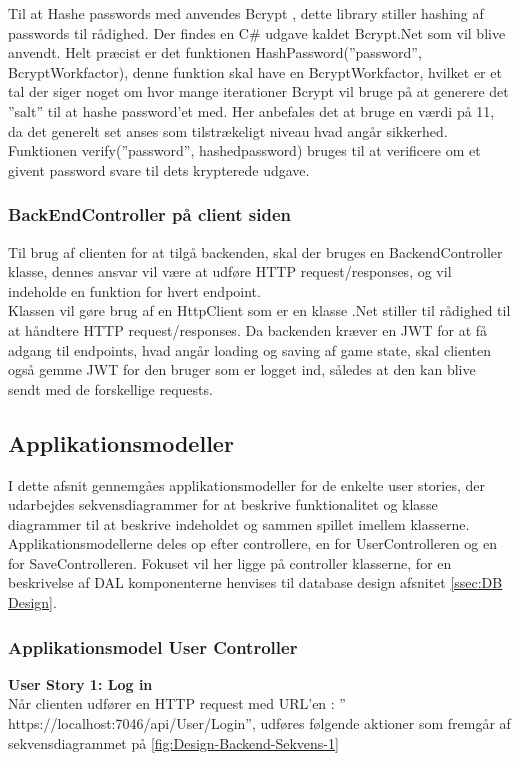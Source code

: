 Til at Hashe passwords med anvendes Bcrypt \cite{Bcrypt}, dette library stiller hashing af passwords til rådighed. Der findes en C\# udgave kaldet Bcrypt.Net  som vil blive anvendt. Helt præcist er det funktionen HashPassword(”password”, BcryptWorkfactor), denne funktion skal have en BcryptWorkfactor, hvilket er et tal der siger noget om hvor mange iterationer Bcrypt vil bruge på at generere det ”salt” til at hashe password’et med. Her anbefales det at bruge en værdi på 11, da det generelt set anses som tilstrækeligt niveau hvad angår sikkerhed.
Funktionen verify(”password”, hashedpassword) bruges til at verificere om et givent password svare til dets krypterede udgave.\\

\subsubsection{BackEndController på client siden}
Til brug af clienten for at tilgå backenden, skal der bruges en BackendController klasse, dennes ansvar vil være at udføre HTTP request/responses, og vil indeholde en funktion for hvert endpoint.\\
 
Klassen vil gøre brug af en HttpClient som er en klasse .Net stiller til rådighed til at håndtere HTTP request/responses. Da backenden kræver en JWT for at få adgang til endpoints, hvad angår loading og saving af game state, skal clienten også gemme JWT for den bruger som er logget ind, således at den kan blive sendt med de forskellige requests.


\subsection{Applikationsmodeller}
I dette afsnit gennemgåes applikationsmodeller for de enkelte user stories, der udarbejdes sekvensdiagrammer for at beskrive funktionalitet og klasse diagrammer til at beskrive indeholdet og sammen spillet imellem klasserne. Applikationsmodellerne deles op efter controllere, en for UserControlleren og en for SaveControlleren. Fokuset vil her ligge på controller klasserne, for en beskrivelse af DAL komponenterne henvises til database design afsnitet \autoref{ssec:DB Design}.\\

\subsubsection{Applikationsmodel User Controller}
\textbf{User Story 1: Log in}\\
Når clienten udfører en HTTP request med URL’en : ” https://localhost:7046/api/User/Login”, udføres følgende aktioner som fremgår af sekvensdiagrammet på \autoref{fig:Design-Backend-Sekvens-1}\\ 

